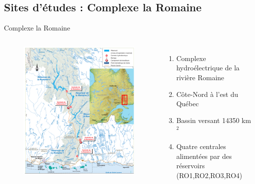 \documentclass[german,12pt]{beamer}
\begin{document}
\subsection{Sites d'études : Complexe la Romaine}
\begin{frame}{Complexe la Romaine}
\begin{columns}
\begin{figure}
\includegraphics[scale=0.5]{projet.PNG}
\end{figure}
\begin{enumerate}
\item Complexe hydroélectrique de la rivière Romaine
\item Côte-Nord à l’est du Québec
\item Bassin versant  14350 km$^2$ 
\item Quatre centrales alimentées par des réservoirs (RO1,RO2,RO3,RO4)
 \end{enumerate}
\end{columns}
\end{frame}
\end{document}
